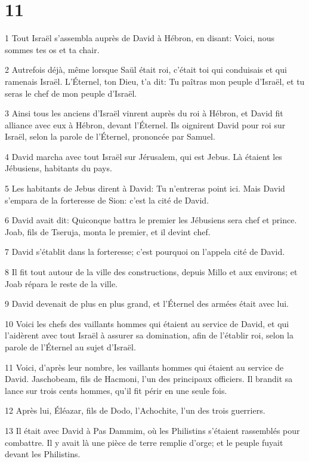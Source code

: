 \chapter{11}

\par 1 Tout Israël s'assembla auprès de David à Hébron, en disant: Voici, nous sommes tes os et ta chair.
\par 2 Autrefois déjà, même lorsque Saül était roi, c'était toi qui conduisais et qui ramenais Israël. L'Éternel, ton Dieu, t'a dit: Tu paîtras mon peuple d'Israël, et tu seras le chef de mon peuple d'Israël.
\par 3 Ainsi tous les anciens d'Israël vinrent auprès du roi à Hébron, et David fit alliance avec eux à Hébron, devant l'Éternel. Ils oignirent David pour roi sur Israël, selon la parole de l'Éternel, prononcée par Samuel.
\par 4 David marcha avec tout Israël sur Jérusalem, qui est Jebus. Là étaient les Jébusiens, habitants du pays.
\par 5 Les habitants de Jebus dirent à David: Tu n'entreras point ici. Mais David s'empara de la forteresse de Sion: c'est la cité de David.
\par 6 David avait dit: Quiconque battra le premier les Jébusiens sera chef et prince. Joab, fils de Tseruja, monta le premier, et il devint chef.
\par 7 David s'établit dans la forteresse; c'est pourquoi on l'appela cité de David.
\par 8 Il fit tout autour de la ville des constructions, depuis Millo et aux environs; et Joab répara le reste de la ville.
\par 9 David devenait de plus en plus grand, et l'Éternel des armées était avec lui.
\par 10 Voici les chefs des vaillants hommes qui étaient au service de David, et qui l'aidèrent avec tout Israël à assurer sa domination, afin de l'établir roi, selon la parole de l'Éternel au sujet d'Israël.
\par 11 Voici, d'après leur nombre, les vaillants hommes qui étaient au service de David. Jaschobeam, fils de Hacmoni, l'un des principaux officiers. Il brandit sa lance sur trois cents hommes, qu'il fit périr en une seule fois.
\par 12 Après lui, Éléazar, fils de Dodo, l'Achochite, l'un des trois guerriers.
\par 13 Il était avec David à Pas Dammim, où les Philistins s'étaient rassemblés pour combattre. Il y avait là une pièce de terre remplie d'orge; et le peuple fuyait devant les Philistins.

